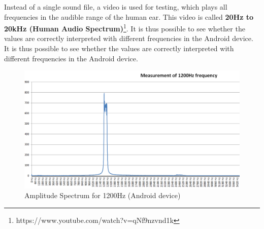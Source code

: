 Instead of a single sound file, a video is used for testing, which plays all frequencies in the audible range of the human ear. This video is called \textbf{20Hz to 20kHz (Human Audio Spectrum)}\footnote{https://www.youtube.com/watch?v=qNf9nzvnd1k}. It is thus possible to see whether the values are correctly interpreted with different frequencies in the Android device.
It is thus possible to see whether the values are correctly interpreted with different frequencies in the Android device.
\newpage
\begin{figure}[h]
	\centering
	\includegraphics[width=.9\textwidth]{imgs/yt1200Hz}
	\caption{Amplitude Spectrum for 1200Hz (Android device)}
	\label{fig:1200HzAndroid}
\end{figure}

